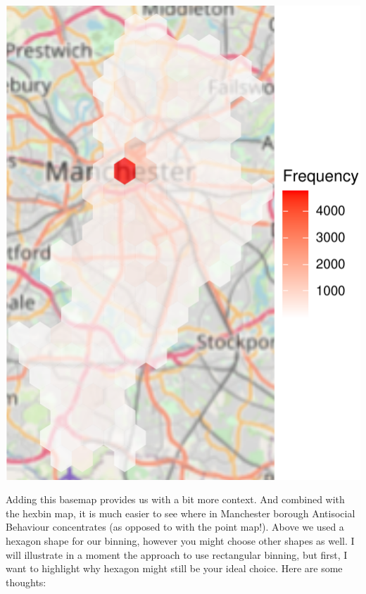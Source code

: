 \documentclass[
]{book}
\begin{document}
\includegraphics{crime_mapping_files/figure-latex/unnamed-chunk-126-1.pdf}

Adding this basemap provides us with a bit more context. And combined with the hexbin map, it is much easier to see where in Manchester borough Antisocial Behaviour concentrates (as opposed to with the point map!). Above we used a hexagon shape for our binning, however you might choose other shapes as well. I will illustrate in a moment the approach to use rectangular binning, but first, I want to highlight why hexagon might still be your ideal choice. Here are some thoughts:
\end{document}
